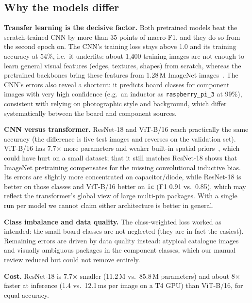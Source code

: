 \documentclass[11pt,a4paper]{article}
\begin{document}
\subsection{Why the models differ}
\textbf{Transfer learning is the decisive factor.} Both pretrained models beat the scratch-trained CNN by more than 35 points of macro-F1, and they do so from the second epoch on. The CNN's training loss stays above 1.0 and its training accuracy at 54\%, i.e.\ it underfits: about 1{,}400 training images are not enough to learn general visual features (edges, textures, shapes) from scratch, whereas the pretrained backbones bring these features from 1.28\,M ImageNet images~\cite{yosinski2014,kornblith2019}. The CNN's errors also reveal a shortcut: it predicts board classes for component images with very high confidence (e.g.\ an inductor as \texttt{raspberry\_pi\_3} at 99\%), consistent with relying on photographic style and background, which differ systematically between the board and component sources.

\textbf{CNN versus transformer.} ResNet-18 and ViT-B/16 reach practically the same accuracy (the difference is five test images and reverses on the validation set). ViT-B/16 has 7.7$\times$ more parameters and weaker built-in spatial priors~\cite{raghu2021}, which could have hurt on a small dataset; that it still matches ResNet-18 shows that ImageNet pretraining compensates for the missing convolutional inductive bias. Its errors are slightly more concentrated on capacitor/diode, while ResNet-18 is better on those classes and ViT-B/16 better on \texttt{ic} (F1 0.91 vs.\ 0.85), which may reflect the transformer's global view of large multi-pin packages. With a single run per model we cannot claim either architecture is better in general.

\textbf{Class imbalance and data quality.} The class-weighted loss worked as intended: the small board classes are not neglected (they are in fact the easiest). Remaining errors are driven by data quality instead: atypical catalogue images and visually ambiguous packages in the component classes, which our manual review reduced but could not remove entirely.

\textbf{Cost.} ResNet-18 is 7.7$\times$ smaller (11.2\,M vs.\ 85.8\,M parameters) and about 8$\times$ faster at inference (1.4 vs.\ 12.1\,ms per image on a T4 GPU) than ViT-B/16, for equal accuracy.
\end{document}
